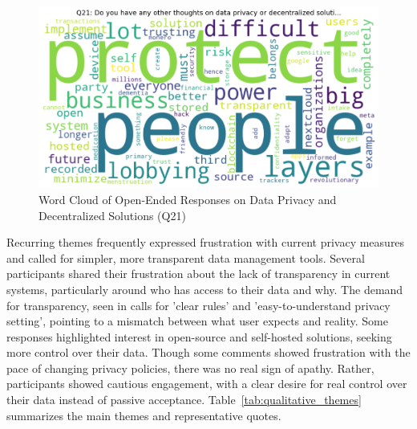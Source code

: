 		\begin{figure}[h!]\centering
			\includegraphics[width=1\linewidth]{figures/questions/Q21_wordcloud.png}
			\caption{Word Cloud of Open-Ended Responses on Data Privacy and Decentralized Solutions (Q21)}
			\label{fig:q21_wordcloud}
		\end{figure}

		Recurring themes frequently expressed frustration with current privacy measures and called for simpler, more transparent data management tools. Several participants shared their frustration about the lack of transparency in current systems, particularly around who has access to their data and why. The demand for transparency, seen in calls for 'clear rules' and 'easy-to-understand privacy setting', pointing to a mismatch between what user expects and reality. 
		Some responses highlighted interest in open-source and self-hosted solutions, seeking more control over their data. Though some comments showed frustration with the pace of changing privacy policies, there was no real sign of apathy. Rather, participants showed cautious engagement, with a clear desire for real control over their data instead of passive acceptance.
		Table~\ref{tab:qualitative_themes} summarizes the main themes and representative quotes.

